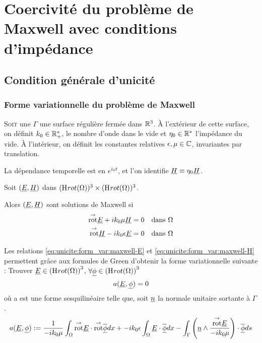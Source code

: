 \section{Coercivité du problème de Maxwell avec conditions d'impédance}
\subsection{Condition générale d'unicité}
\subsubsection{Forme variationnelle du problème de Maxwell}

\lettrine{S}{oit} une $\Gamma$ une surface régulière fermée dans $\mathbb R^3$. 
À l'extérieur de cette surface, on définit $k_0 \in \mathbb R_+^*$, le nombre d'onde dans le vide et $\eta_0 \in \mathbb R^*$ l'impédance du vide.
À l'intérieur, on définit les constantes relatives $\epsilon,\mu \in \mathbb C$, invariantes par translation.

\begin{tcolorbox}
\centering
La dépendance temporelle est en $e^{i\omega t}$, et l'on identifie $\underline{H} \equiv \eta _0 \underline{H}$.
\end{tcolorbox}



Soit $(\underline{E},\underline{H})$ dans $(\mathrm{H}_\mathrm{{}}{rot}(\Omega))^3 \times (\mathrm{H}_\mathrm{{}}{rot}(\Omega))^3$. 

Alors $(\underline{E},\underline{H})$ sont solutions de Maxwell si 
\begin{align}
\label{eq:unicite:form_var:maxwell-E}
{{\overset{\rightarrow}{\operatorname{rot}}}} \underline{E} + ik_0 \mu \underline{H} &= 0 && \text{dans $\Omega$}
\\\label{eq:unicite:form_var:maxwell-H}
{{\overset{\rightarrow}{\operatorname{rot}}}} \underline{H} - ik_0\epsilon \underline{E} &= 0 && \text{dans $\Omega$}
  \end{align}

Les relations \eqref{eq:unicite:form_var:maxwell-E} et \eqref{eq:unicite:form_var:maxwell-H} permettent grâce aux formules de Green d'obtenir la forme variationnelle suivante :
Trouver $\underline{E} \in \left(\mathrm{H}_\mathrm{{}}{rot}(\Omega)\right)^3$, $\forall \underline{\phi} \in \left(\mathrm{H}_\mathrm{{}}{rot}(\Omega)\right)^3$
\[
a(\underline{E},\underline{\phi}) = 0
\]
où a est une forme sesquilinéaire telle que, soit $\underline{n}$ la normale unitaire sortante à $\Gamma$.
\begin{align*}
a(\underline{E},\underline{\phi}) &:=  \dfrac{1}{-ik_0\mu} \int_\Omega {{\overset{\rightarrow}{\operatorname{rot}}}} \underline{E} \cdot {{\overset{\rightarrow}{\operatorname{rot}}}} {\overline{\underline{\phi}}} dx + -ik_0\epsilon\int_\Omega\underline{E}\cdot{\overline{\underline{\phi}}} dx
 - \int_\Gamma \left(\underline{n} \wedge \dfrac{{{\overset{\rightarrow}{\operatorname{rot}}}} \underline{E}}{-ik_0\mu}\right) \cdot {\overline{\underline{\phi}}} ds \\
 \end{align*}

